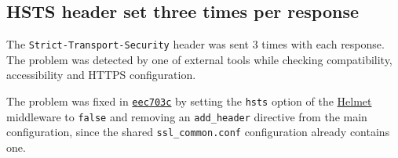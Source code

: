 \subsection{HSTS header set three times per response}

The \texttt{Strict-Transport-Security} header was sent 3 times with each response. The problem was detected by one of external tools while checking compatibility, accessibility and HTTPS configuration.

The problem was fixed in \href{https://github.com/krzysdz/inz/commit/eec703c98ecb6720c3c2eb0ceee36ca3d7da8aa2}{\texttt{eec703c}} by setting the \texttt{hsts} option of the \href{https://helmetjs.github.io/}{Helmet} middleware to \texttt{false} and removing an \texttt{add\_header} directive from the main configuration, since the shared \texttt{ssl\_common.conf} configuration already contains one.
